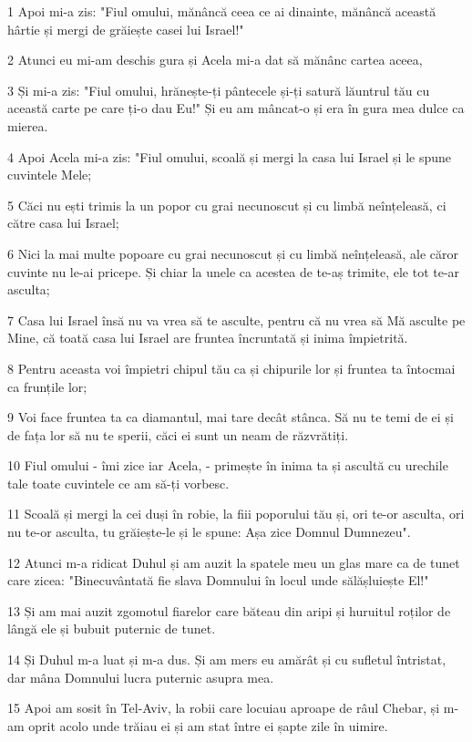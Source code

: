 \par 1 Apoi mi-a zis: "Fiul omului, mănâncă ceea ce ai dinainte, mănâncă această hârtie și mergi de grăiește casei lui Israel!"
\par 2 Atunci eu mi-am deschis gura și Acela mi-a dat să mănânc cartea aceea,
\par 3 Și mi-a zis: "Fiul omului, hrănește-ți pântecele și-ți satură lăuntrul tău cu această carte pe care ți-o dau Eu!" Și eu am mâncat-o și era în gura mea dulce ca mierea.
\par 4 Apoi Acela mi-a zis: "Fiul omului, scoală și mergi la casa lui Israel și le spune cuvintele Mele;
\par 5 Căci nu ești trimis la un popor cu grai necunoscut și cu limbă neînțeleasă, ci către casa lui Israel;
\par 6 Nici la mai multe popoare cu grai necunoscut și cu limbă neînțeleasă, ale căror cuvinte nu le-ai pricepe. Și chiar la unele ca acestea de te-aș trimite, ele tot te-ar asculta;
\par 7 Casa lui Israel însă nu va vrea să te asculte, pentru că nu vrea să Mă asculte pe Mine, că toată casa lui Israel are fruntea încruntată și inima împietrită.
\par 8 Pentru aceasta voi împietri chipul tău ca și chipurile lor și fruntea ta întocmai ca frunțile lor;
\par 9 Voi face fruntea ta ca diamantul, mai tare decât stânca. Să nu te temi de ei și de fața lor să nu te sperii, căci ei sunt un neam de răzvrătiți.
\par 10 Fiul omului - îmi zice iar Acela, - primește în inima ta și ascultă cu urechile tale toate cuvintele ce am să-ți vorbesc.
\par 11 Scoală și mergi la cei duși în robie, la fiii poporului tău și, ori te-or asculta, ori nu te-or asculta, tu grăiește-le și le spune: Așa zice Domnul Dumnezeu".
\par 12 Atunci m-a ridicat Duhul și am auzit la spatele meu un glas mare ca de tunet care zicea: "Binecuvântată fie slava Domnului în locul unde sălășluiește El!"
\par 13 Și am mai auzit zgomotul fiarelor care băteau din aripi și huruitul roților de lângă ele și bubuit puternic de tunet.
\par 14 Și Duhul m-a luat și m-a dus. Și am mers eu amărât și cu sufletul întristat, dar mâna Domnului lucra puternic asupra mea.
\par 15 Apoi am sosit în Tel-Aviv, la robii care locuiau aproape de râul Chebar, și m-am oprit acolo unde trăiau ei și am stat între ei șapte zile în uimire.
